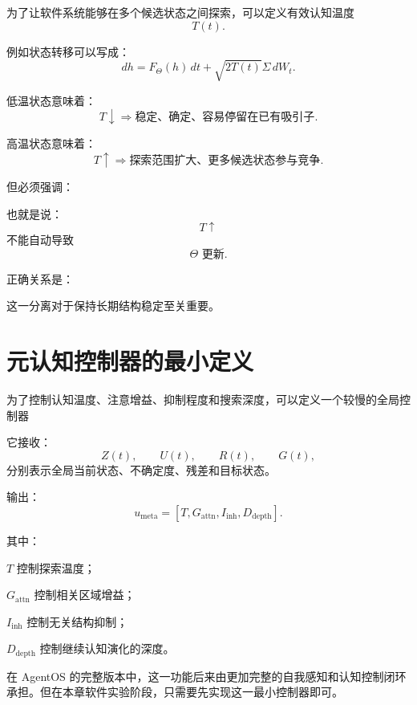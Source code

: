 为了让软件系统能够在多个候选状态之间探索，可以定义有效认知温度
\[
T(t).
\]

例如状态转移可以写成：
\[
dh
=
F_\Theta(h)\,dt
+
\sqrt{2T(t)}
\Sigma\,dW_t.
\]

低温状态意味着：
\[
T\downarrow
\Rightarrow
\text{稳定、确定、容易停留在已有吸引子}.
\]

高温状态意味着：
\[
T\uparrow
\Rightarrow
\text{探索范围扩大、更多候选状态参与竞争}.
\]

但必须强调：
\begin{statementbox}
\centering
{}
\end{statementbox}

也就是说：
\[
T\uparrow
\]
不能自动导致
\[
\Theta\text{ 更新}.
\]

正确关系是：
\begin{statementbox}
\centering
{}
\end{statementbox}

这一分离对于保持长期结构稳定至关重要。

\section{元认知控制器的最小定义}

为了控制认知温度、注意增益、抑制程度和搜索深度，可以定义一个较慢的全局控制器
\begin{statementbox}
\centering
{}
\end{statementbox}

它接收：
\[
Z(t),
\qquad
U(t),
\qquad
R(t),
\qquad
G(t),
\]
分别表示全局当前状态、不确定度、残差和目标状态。

输出：
\[
u_{\mathrm{meta}}
=
[
T,
G_{\mathrm{attn}},
I_{\mathrm{inh}},
D_{\mathrm{depth}}
].
\]

其中：

$T$ 控制探索温度；

$G_{\mathrm{attn}}$ 控制相关区域增益；

$I_{\mathrm{inh}}$ 控制无关结构抑制；

$D_{\mathrm{depth}}$ 控制继续认知演化的深度。

在 AgentOS 的完整版本中，这一功能后来由更加完整的自我感知和认知控制闭环承担。但在本章软件实验阶段，只需要先实现这一最小控制器即可。

